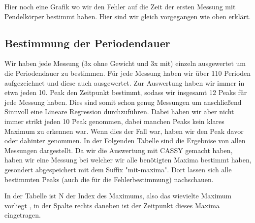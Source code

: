 \documentclass[twoside]{protokoll}
\begin{document}
Hier noch eine Grafik wo wir den Fehler auf die Zeit der ersten Messung mit Pendelkörper bestimmt haben. 
Hier sind wir gleich vorgegangen wie oben erklärt. 

\subsection{Bestimmung der Periodendauer}
Wir haben jede Messung (3x ohne Gewicht und 3x mit) einzeln ausgewertet um die Periodendauer zu bestimmen.
Für jede Messung haben wir über 110 Perioden aufgezeichnet und diese auch ausgewertet. 
Zur Auswertung haben wir immer in etwa jeden 10. Peak den Zeitpunkt bestimmt, sodass wir insgesamt 12 Peaks für jede Messung haben.
Dies sind somit schon genug Messungen um anschließend Sinnvoll eine Lineare Regression durchzuführen.
Dabei haben wir aber nicht immer strikt jeden 10 Peak genommen, dabei manchen Peaks kein klares Maximum zu erkennen war.
Wenn dies der Fall war, haben wir den Peak davor oder dahinter genommen.
In der Folgenden Tabelle sind die Ergebnise von allen Messungen dargestellt.
Da wir die Auswertung mit CASSY gemacht haben, haben wir eine Messung bei welcher wir alle benötigten Maxima bestimmt haben, gesondert abgespeichert mit dem Suffix "mit-maxima".
Dort lassen sich alle bestimmten Peaks (auch die für die Fehlerbestimmung) nachschauen.

In der Tabelle ist N der Index des Maximums, also das wievielte Maximum vorliegt , in der Spalte rechts daneben ist der Zeitpunkt dieses Maxima eingetragen.
\end{document}
